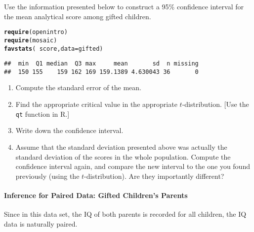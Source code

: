 \documentclass[10pt]{article}\usepackage[]{graphicx}\usepackage[]{color}
\makeatletter
\newcommand{\hlopt}[1]{\textcolor[rgb]{0,0,0}{#1}}%
\newcommand{\hlstd}[1]{\textcolor[rgb]{0.345,0.345,0.345}{#1}}%
\newcommand{\hlkwc}[1]{\textcolor[rgb]{0.333,0.667,0.333}{#1}}%
\newcommand{\hlkwd}[1]{\textcolor[rgb]{0.737,0.353,0.396}{\textbf{#1}}}%
\newenvironment{kframe}{%
 \def\at@end@of@kframe{}%
 \ifinner\ifhmode%
  \def\at@end@of@kframe{\end{minipage}}%
  \begin{minipage}{\columnwidth}%
 \fi\fi%
 \def\FrameCommand##1{\hskip\@totalleftmargin \hskip-\fboxsep
 \colorbox{shadecolor}{##1}\hskip-\fboxsep
     \hskip-\linewidth \hskip-\@totalleftmargin \hskip\columnwidth}%
 \MakeFramed {\advance\hsize-\width
   \@totalleftmargin\z@ \linewidth\hsize
   \@setminipage}}%
 {\par\unskip\endMakeFramed%
 \at@end@of@kframe}
\newenvironment{knitrout}{}{} %
\newcommand{\R}{{\sf R}\xspace}
\newcommand{\cmd}[1]{\texttt{#1}}
\makeatother
\begin{document}
Use the information presented below to construct a 95\% confidence interval for the mean analytical score among gifted children. 

\begin{knitrout}
\color{fgcolor}\begin{kframe}
\begin{alltt}
\hlkwd{require}\hlstd{(openintro)}
\hlkwd{require}\hlstd{(mosaic)}
\hlkwd{favstats}\hlstd{(}\hlopt{~}\hlstd{score,} \hlkwc{data} \hlstd{= gifted)}
\end{alltt}
\begin{verbatim}
##  min  Q1 median  Q3 max     mean       sd  n missing
##  150 155    159 162 169 159.1389 4.630043 36       0
\end{verbatim}
\end{kframe}
\end{knitrout}

\begin{enumerate}
  \itemsep1in
  \item Compute the standard error of the mean.
  \item Find the appropriate critical value in the appropriate $t$-distribution. [Use the \cmd{qt} function in \R.]
  \item Write down the confidence interval.
  \item Assume that the standard deviation presented above was actually the standard deviation of the scores in the whole population. Compute the confidence interval again, and compare the new interval to the one you found previously (using the $t$-distribution). Are they importantly different? 
\end{enumerate}

  \vspace{1in}

\paragraph{Inference for Paired Data: Gifted Children's Parents}

Since in this data set, the IQ of both parents is recorded for all children, the IQ data is naturally paired. 
\end{document}
